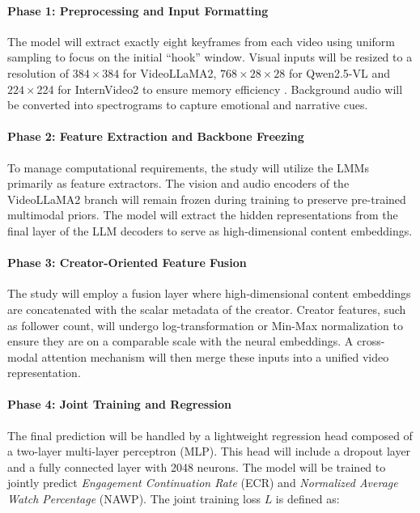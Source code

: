 \paragraph{Phase 1: Preprocessing and Input Formatting}
The model will extract exactly eight keyframes from each video using uniform sampling to focus on the initial ``hook'' window. Visual inputs will be resized to a resolution of $384 \times 384$ for VideoLLaMA2, $768 \times 28 \times 28$ for Qwen2.5-VL and $224 \times $224 for InternVideo2 to ensure memory efficiency \cite{li2025vquala} . Background audio will be converted into spectrograms to capture emotional and narrative cues.

\paragraph{Phase 2: Feature Extraction and Backbone Freezing}
To manage computational requirements, the study will utilize the LMMs primarily as feature extractors. The vision and audio encoders of the VideoLLaMA2 branch will remain frozen during training to preserve pre-trained multimodal priors. The model will extract the hidden representations from the final layer of the LLM decoders to serve as high-dimensional content embeddings.

\paragraph{Phase 3: Creator-Oriented Feature Fusion}
The study will employ a fusion layer where high-dimensional content embeddings are concatenated with the scalar metadata of the creator. Creator features, such as follower count, will undergo log-transformation or Min-Max normalization to ensure they are on a comparable scale with the neural embeddings. A cross-modal attention mechanism will then merge these inputs into a unified video representation.

\paragraph{Phase 4: Joint Training and Regression}
The final prediction will be handled by a lightweight regression head composed of a two-layer multi-layer perceptron (MLP). This head will include a dropout layer and a fully connected layer with 2048 neurons. The model will be trained to jointly predict \textit{Engagement Continuation Rate} (ECR) and \textit{Normalized Average Watch Percentage} (NAWP). The joint training loss $L$ is defined as:

